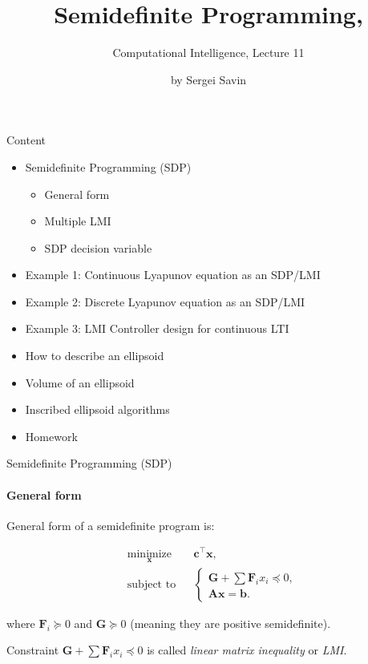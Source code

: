 \documentclass{beamer}
\title{Semidefinite Programming, }
\subtitle{Computational Intelligence, Lecture 11}
\author{by Sergei Savin}
\date{\mydate}
\begin{document}
\maketitle


\begin{frame}{Content}

\begin{itemize}
\item  Semidefinite Programming (SDP)
\begin{itemize}
    \item General form
    \item Multiple LMI
    \item SDP decision variable
\end{itemize}
\item  Example 1:  Continuous Lyapunov equation as an SDP/LMI
\item  Example 2:  Discrete Lyapunov equation as an SDP/LMI
\item  Example 3:  LMI Controller design for continuous LTI
\item How to describe an ellipsoid
\item Volume of an ellipsoid
\item Inscribed ellipsoid algorithms
\item Homework
\end{itemize}
\end{frame}



\begin{frame}{Semidefinite Programming (SDP)}
\framesubtitle{General form}
\begin{flushleft}

General form of a semidefinite program is:

%
\begin{equation}
\begin{aligned}
& \underset{\mathbf{x}}{\text{minimize}}
& & \mathbf{c}^\top\mathbf{x}, \\
& \text{subject to}
& & \begin{cases}
    \mathbf{G} + \sum \mathbf{F}_i x_i \preceq 0, \\
    \mathbf{A}\mathbf{x} = \mathbf{b}.
    \end{cases}
\end{aligned}
\end{equation}

where $\mathbf{F}_i \succeq 0$ and $\mathbf{G} \succeq 0$ (meaning they are positive semidefinite).

\bigskip

Constraint $\mathbf{G} + \sum \mathbf{F}_i x_i \preceq 0$ is called \emph{linear matrix inequality} or \emph{LMI}.
 
\end{flushleft}
\end{frame}
\end{document}
